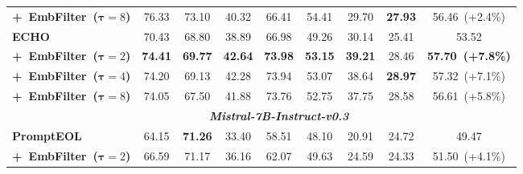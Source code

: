 \documentclass{llmxive}
\begin{document}
\begin{table}[t]
{\begin{tabular}{lcccccccc}
            \quad \textbf{\textrm{+~EmbFilter~(\(\mathbf{\tau}=8\))}} & \cellcolor{MediumTurquoise!15} 76.33 & 73.10 & \cellcolor{MediumTurquoise!15} 40.32 & \cellcolor{MediumTurquoise!15} 66.41 & \cellcolor{MediumTurquoise!15} 54.41 & \cellcolor{MediumTurquoise!15} 29.70 & \cellcolor{MediumTurquoise!15} \textbf{27.93} & \cellcolor{MediumTurquoise!15} 56.46~(+2.4\%) \\
            \cmidrule(l{4pt}r{4pt}){1-9}
            \textbf{\textrm{ECHO}} & 70.43 & 68.80 & 38.89 & 66.98 & 49.26 & 30.14 & 25.41 & 53.52 \\
            \cmidrule(l{1pt}r{1pt}){1-9}
            \quad \textbf{\textrm{+~EmbFilter~(\(\mathbf{\tau}=2\))}} & \cellcolor{MediumTurquoise!15} \textbf{74.41} & \cellcolor{MediumTurquoise!15} \textbf{69.77} & \cellcolor{MediumTurquoise!15} \textbf{42.64} & \cellcolor{MediumTurquoise!15} \textbf{73.98} & \cellcolor{MediumTurquoise!15} \textbf{53.15} & \cellcolor{MediumTurquoise!15} \textbf{39.21} & \cellcolor{MediumTurquoise!15} 28.46 & \cellcolor{MediumTurquoise!15} \textbf{57.70~(+7.8\%)} \\
            \quad \textbf{\textrm{+~EmbFilter~(\(\mathbf{\tau}=4\))}}  & \cellcolor{MediumTurquoise!15} 74.20 & \cellcolor{MediumTurquoise!15} 69.13 & \cellcolor{MediumTurquoise!15} 42.28 & \cellcolor{MediumTurquoise!15} 73.94 & \cellcolor{MediumTurquoise!15} 53.07 & \cellcolor{MediumTurquoise!15} 38.64 & \cellcolor{MediumTurquoise!15} \textbf{28.97} & \cellcolor{MediumTurquoise!15} 57.32~(+7.1\%) \\
            \quad \textbf{\textrm{+~EmbFilter~(\(\mathbf{\tau}=8\))}} & \cellcolor{MediumTurquoise!15} 74.05 & 67.50 & \cellcolor{MediumTurquoise!15} 41.88 & \cellcolor{MediumTurquoise!15} 73.76 & \cellcolor{MediumTurquoise!15} 52.75 & \cellcolor{MediumTurquoise!15} 37.75 & \cellcolor{MediumTurquoise!15} 28.58 & \cellcolor{MediumTurquoise!15} 56.61~(+5.8\%) \\
            \midrule
            \multicolumn{1}{c}{} & \multicolumn{7}{c}{\textbf{\textit{\textrm{Mistral-7B-Instruct-v0.3}}}} \\
            \midrule
            \textbf{\textrm{PromptEOL}} & 64.15 & \textbf{71.26} & 33.40 & 58.51 & 48.10 & 20.91 & 24.72 & 49.47   \\
            \cmidrule(l{1pt}r{1pt}){1-9}
            \quad \textbf{\textrm{+~EmbFilter~(\(\mathbf{\tau}=2\))}} & \cellcolor{DodgerBlue!15} 66.59 & 71.17 & \cellcolor{DodgerBlue!15} 36.16 & \cellcolor{DodgerBlue!15} 62.07 & \cellcolor{DodgerBlue!15} 49.63 & \cellcolor{DodgerBlue!15} 24.59 & 24.33 & \cellcolor{DodgerBlue!15} 51.50~(+4.1\%) \\

\end{tabular}}
\end{table}
\end{document}
